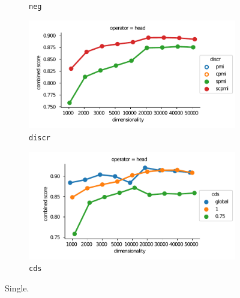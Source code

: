 \begin{figure}[b]
\begin{subfigure}[t]{0.49\textwidth}
  \caption{\texttt{neg}}
  \label{fig:single-neg}
  \end{subfigure}
  \begin{subfigure}[t]{0.49\textwidth}

  \includegraphics[width=\textwidth]{supplement/figures/single-interaction-discr}

  \caption{\texttt{discr}}
  \label{fig:single-discr}
  \end{subfigure}

  \begin{subfigure}[t]{0.49\textwidth}

  \includegraphics[width=\textwidth]{supplement/figures/single-interaction-cds}

  \caption{\texttt{cds}}
  \label{fig:single-cds}
  \end{subfigure}

  \caption{Single.}
  \label{fig:single-params}
\end{figure}
